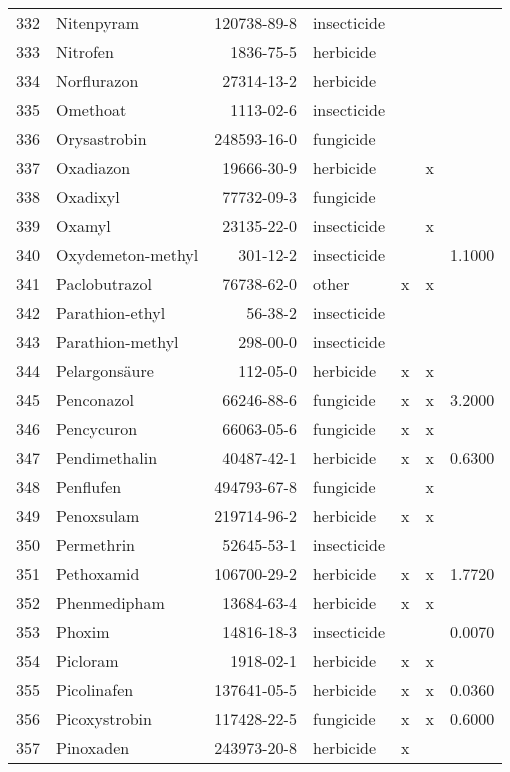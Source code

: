 \begin{longtable}{lp{4cm}rlp{1.3cm}p{1.3cm}p{1.5cm}}
  332 & Nitenpyram & 120738-89-8 & insecticide &  &  &  \\ 
  333 & Nitrofen & 1836-75-5 & herbicide &  &  &  \\ 
  334 & Norflurazon & 27314-13-2 & herbicide &  &  &  \\ 
  335 & Omethoat & 1113-02-6 & insecticide &  &  &  \\ 
  336 & Orysastrobin & 248593-16-0 & fungicide &  &  &  \\ 
  337 & Oxadiazon & 19666-30-9 & herbicide &  & x &  \\ 
  338 & Oxadixyl & 77732-09-3 & fungicide &  &  &  \\ 
  339 & Oxamyl & 23135-22-0 & insecticide &  & x &  \\ 
  340 & Oxydemeton-methyl & 301-12-2 & insecticide &  &  & 1.1000 \\ 
  341 & Paclobutrazol & 76738-62-0 & other & x & x &  \\ 
  342 & Parathion-ethyl & 56-38-2 & insecticide &  &  &  \\ 
  343 & Parathion-methyl & 298-00-0 & insecticide &  &  &  \\ 
  344 & Pelargonsäure & 112-05-0 & herbicide & x & x &  \\ 
  345 & Penconazol & 66246-88-6 & fungicide & x & x & 3.2000 \\ 
  346 & Pencycuron & 66063-05-6 & fungicide & x & x &  \\ 
  347 & Pendimethalin & 40487-42-1 & herbicide & x & x & 0.6300 \\ 
  348 & Penflufen & 494793-67-8 & fungicide &  & x &  \\ 
  349 & Penoxsulam & 219714-96-2 & herbicide & x & x &  \\ 
  350 & Permethrin & 52645-53-1 & insecticide &  &  &  \\ 
  351 & Pethoxamid & 106700-29-2 & herbicide & x & x & 1.7720 \\ 
  352 & Phenmedipham & 13684-63-4 & herbicide & x & x &  \\ 
  353 & Phoxim & 14816-18-3 & insecticide &  &  & 0.0070 \\ 
  354 & Picloram & 1918-02-1 & herbicide & x & x &  \\ 
  355 & Picolinafen & 137641-05-5 & herbicide & x & x & 0.0360 \\ 
  356 & Picoxystrobin & 117428-22-5 & fungicide & x & x & 0.6000 \\ 
  357 & Pinoxaden & 243973-20-8 & herbicide & x &  &  \\ 

\end{longtable}
